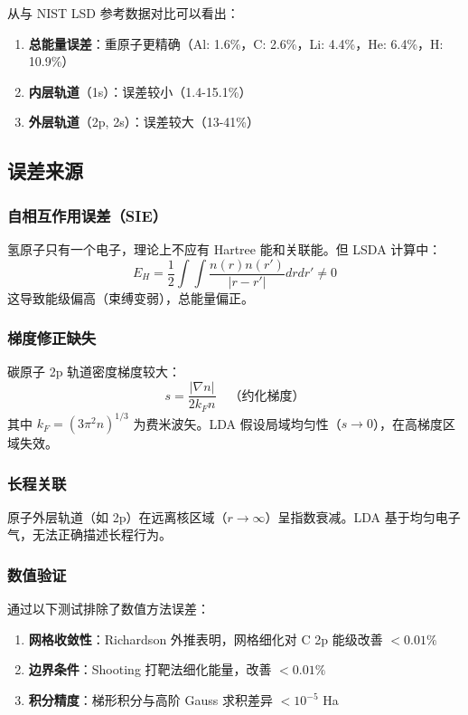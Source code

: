 \documentclass[12pt,a4paper]{article}
\begin{document}
从与 NIST LSD 参考数据对比可以看出：
\begin{enumerate}
    \item \textbf{总能量误差}：重原子更精确（Al: 1.6\%，C: 2.6\%，Li: 4.4\%，He: 6.4\%，H: 10.9\%）
    \item \textbf{内层轨道}（1s）：误差较小（1.4-15.1\%）
    \item \textbf{外层轨道}（2p, 2s）：误差较大（13-41\%）
\end{enumerate}

\subsection{误差来源}

\subsubsection{自相互作用误差（SIE）}

氢原子只有一个电子，理论上不应有 Hartree 能和关联能。但 LSDA 计算中：
\begin{equation}
    E_H = \frac{1}{2}\int\int \frac{n(r)n(r')}{|r-r'|} dr dr' \neq 0
\end{equation}
这导致能级偏高（束缚变弱），总能量偏正。

\subsubsection{梯度修正缺失}

碳原子 2p 轨道密度梯度较大：
\begin{equation}
    s = \frac{|\nabla n|}{2k_F n} \quad \text{（约化梯度）}
\end{equation}
其中 $k_F = (3\pi^2 n)^{1/3}$ 为费米波矢。LDA 假设局域均匀性（$s \to 0$），在高梯度区域失效。

\subsubsection{长程关联}

原子外层轨道（如 2p）在远离核区域（$r \to \infty$）呈指数衰减。LDA 基于均匀电子气，无法正确描述长程行为。

\subsubsection{数值验证}

通过以下测试排除了数值方法误差：
\begin{enumerate}
    \item \textbf{网格收敛性}：Richardson 外推表明，网格细化对 C 2p 能级改善 $<0.01\%$
    \item \textbf{边界条件}：Shooting 打靶法细化能量，改善 $<0.01\%$
    \item \textbf{积分精度}：梯形积分与高阶 Gauss 求积差异 $<10^{-5}$ Ha
\end{enumerate}
\end{document}
